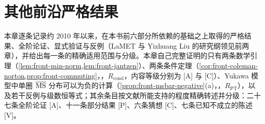 \chapter{其他前沿严格结果}\label{ch:front}

本章逐条记录约 2010 年以来，在本书前六部分所依赖的基础之上取得的严格结果、全阶论证、显式验证与反例（LaMET 与 Yizhuang Liu 的研究纲领见前两章），并给出每一条的精确适用范围与分级。本章自己完整证明的只有两条数学引理（\cref{lem:front-min-norm,lem:front-jantzen}）、两条条件定理（\cref{cor:front-coleman-norton,prop:front-commuting}，\tagR，$R_{\mathrm{cond}}$，内容等级分别为 [A] 与 [C]）、Yukawa 模型中单圈 $\overline{\mathrm{MS}}$ 分布可以为负的计算（\cref{prop:front-msbar-negative}(a)，\tagR，$R_{\mathrm{PT}}$），以及若干反例与级数恒等式；其余条目按文献所能支持的程度精确转述并分级：二十七条全阶论证 [A]、十一条部分结果 [P]、六条猜想 [C]、七条已知不成立的陈述 [V]。

